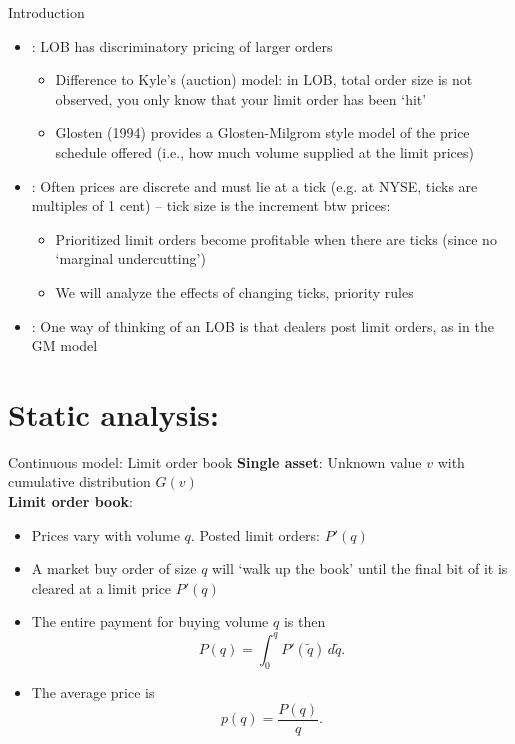 \documentclass[english,10pt]{beamer}
\begin{document}
\begin{frame}{Introduction}
	\begin{itemize}
		\item {}:  LOB has discriminatory pricing of larger orders
		\begin{itemize}
			\item Difference to Kyle's (auction) model: in LOB, total order size is not observed, you only know that your limit order has been `hit'
			\item Glosten (1994) provides a Glosten-Milgrom style model of the price schedule offered (i.e., how much volume supplied at the limit prices)
		\end{itemize}
		\item {}: Often prices are discrete and must lie at a tick (e.g. at NYSE, ticks are multiples of 1 cent) --  tick size is the increment btw prices:
		\begin{itemize}
			\item Prioritized limit orders become profitable when there are ticks 
			(since no `marginal undercutting')
			\item We will analyze the effects of changing ticks, priority rules
		\end{itemize}
		\item {}: One way of thinking of an LOB is that dealers post limit orders, as in the GM model
	\end{itemize}
\end{frame}



\section{Static analysis: \cite{glosten_is_1994}}

\begin{frame}{Continuous model: Limit order book}
	\textbf{Single asset}: Unknown value $v$ with cumulative distribution  $G(v)$
	\\
	\textbf{Limit order book}: 
	\begin{itemize}
		\item Prices vary with volume $q$. Posted limit orders: $P'(q)$
		\item A market buy order of size $q$ will `walk up the book' until the final bit of it is cleared at a limit price $P'(q)$
		\item The entire payment for buying volume $q$ is then
		\[
		P(q) = \int_0^q P'(\tilde{q}) \, d\tilde{q}.
		\]
		\item The average price is 
		\[
		p(q) = \frac{P(q)}{q}.
		\]
	\end{itemize}
\end{frame}
\end{document}
